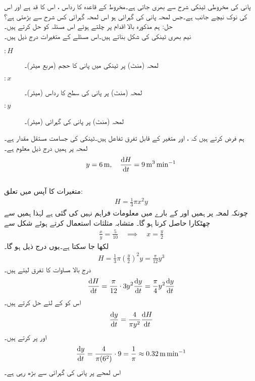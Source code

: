 پانی کی مخروطی ٹینکی   شرح سے بھری جاتی ہے۔مخروط کے قاعدہ کا رداس ، اس کا قد  ہے  اور اس کی نوک نیچے جانب ہے۔جس لمحہ پانی کی گہرائی  ہو اس لمحہ گہرائی کس شرح سے بڑھتی ہے؟\\
حل:\quad
ہم مذکورہ بالا اقدام پر چلتے ہوئے اس مسئلہ کو حل کرتے ہیں۔\\
\quad
{} نیم بھری ٹینکی کی شکل بناتے ہیں۔اس مسئلے کے متغیرات درج ذیل ہیں۔
\begin{description}
\item[$:H$]
لمحہ  (منٹ) پر ٹینکی میں پانی کا حجم (مربع میٹر)۔
\item[$:x$]
لمحہ  (منٹ) پر پانی کی سطح کا رداس (میٹر)۔
\item[$:y$]
لمحہ  (منٹ) پر پانی کی گہرائی (میٹر)۔
\end{description}
ہم فرض کرتے ہیں کہ ،  اور  متغیر  کے قابل تفرق تفاعل ہیں۔ٹینکی کی جسامت مستقل مقدار ہے۔\\
\quad
{} لمحہ  پر ہمیں درج ذیل معلوم ہے۔
\begin{align*}
y=\SI{6}{\meter},\quad \frac{\dif H}{\dif t}=\SI{9}{\meter\cubed\per\minute}
\end{align*}
\quad
{}  \\
\quad
متغیرات کا آپس میں تعلق:
\begin{align*}
H=\frac{1}{3}\pi x^2 y
\end{align*}
چونکہ لمحہ  پر ہمیں  اور  کے بارے میں معلومات فراہم نہیں کی گئی ہے لہٰذا ہمیں  سے چھٹکارا حاصل کرنا ہو گا۔ متشابہ مثلثات استعمال کرتے ہوئے شکل سے
\begin{align*}
\frac{x}{y}=\frac{5}{10}\quad \implies \quad x=\frac{y}{2}
\end{align*}
لکھا جا سکتا ہے۔یوں درج ذیل ہو گا۔
\begin{align*}
H=\frac{1}{3}\pi (\tfrac{y}{2})^2y=\frac{\pi}{12}y^3
\end{align*}
\quad
{}  درج بالا مساوات کا تفرق لیتے ہیں۔
\begin{align*}
\frac{\dif H}{\dif t}=\frac{\pi}{12} \cdot 3y^2\frac{\dif y}{\dif t}=\frac{\pi}{4}y^2\frac{\dif y}{\dif t}
\end{align*}
اس کو  کے لئے حل کرتے ہیں۔
\begin{align*}
\frac{\dif y}{\dif t}=\frac{4}{\pi y^2}\frac{\dif H}{\dif t}
\end{align*}
\quad
{}   اور  پر کرتے ہیں۔
\begin{align*}
\frac{\dif y}{\dif t}=\frac{4}{\pi (6^2)}\cdot 9=\frac{1}{\pi}\approx \SI{0.32}{\meter\per\minute}
\end{align*}
اس لمحے پر پانی کی گہرائی   سے بڑھ رہی ہے۔

